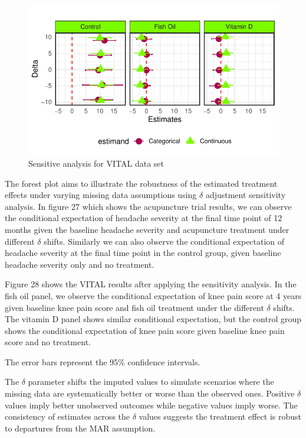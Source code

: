\documentclass{article}
\newcommand{\pandocbounded}[1]{#1}
\begin{document}
\begin{figure}
\centering
\pandocbounded{\includegraphics[keepaspectratio]{Final_Report_files/figure-latex/unnamed-chunk-34-1.pdf}}
\caption{Sensitive analysis for VITAL data set}
\end{figure}

The forest plot aims to illustrate the robustness of the estimated
treatment effects under varying missing data assumptions using
\(\delta\) adjustment sensitivity analysis. In figure 27 which shows the
acupuncture trial results, we can observe the conditional expectation of
headache severity at the final time point of 12 months given the
baseline headache severity and acupuncture treatment under different
\(\delta\) shifts. Similarly we can also observe the conditional
expectation of headache severity at the final time point in the control
group, given baseline headache severity only and no treatment.

Figure 28 shows the VITAL results after applying the sensitivity
analysis. In the fish oil panel, we observe the conditional expectation
of knee pain score at 4 years given baseline knee pain score and fish
oil treatment under the different \(\delta\) shifts. The vitamin D panel
shows similar conditional expectation, but the control group shows the
conditional expectation of knee pain score given baseline knee pain
score and no treatment.

The error bars represent the 95\% confidence intervals.

The \(\delta\) parameter shifts the imputed values to simulate scenarios
where the missing data are systematically better or worse than the
observed ones. Positive \(\delta\) values imply better unobserved
outcomes while negative values imply worse. The consistency of estimates
across the \(\delta\) values suggests the treatment effect is robust to
departures from the MAR assumption.
\end{document}
